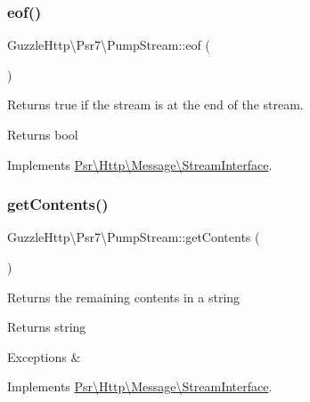 \subsubsection{\texorpdfstring{eof()}{eof()}}
{\footnotesize\ttfamily Guzzle\+Http\textbackslash{}\+Psr7\textbackslash{}\+Pump\+Stream\+::eof (\begin{DoxyParamCaption}{ }\end{DoxyParamCaption})}

Returns true if the stream is at the end of the stream.

\begin{DoxyReturn}{Returns}
bool 
\end{DoxyReturn}


Implements \hyperlink{interfacePsr_1_1Http_1_1Message_1_1StreamInterface_a502cc5ca370c6925b78d95d86d68777c}{Psr\textbackslash{}\+Http\textbackslash{}\+Message\textbackslash{}\+Stream\+Interface}.

\mbox{\label{classGuzzleHttp_1_1Psr7_1_1PumpStream_a15286eba4928175f71e085d042707717}} 
\subsubsection{\texorpdfstring{get\+Contents()}{getContents()}}
{\footnotesize\ttfamily Guzzle\+Http\textbackslash{}\+Psr7\textbackslash{}\+Pump\+Stream\+::get\+Contents (\begin{DoxyParamCaption}{ }\end{DoxyParamCaption})}

Returns the remaining contents in a string

\begin{DoxyReturn}{Returns}
string 
\end{DoxyReturn}

\begin{DoxyExceptions}{Exceptions}
{\em } & \\
\hline
\end{DoxyExceptions}


Implements \hyperlink{interfacePsr_1_1Http_1_1Message_1_1StreamInterface_a77f73d536f77e4a4e281d548ee905276}{Psr\textbackslash{}\+Http\textbackslash{}\+Message\textbackslash{}\+Stream\+Interface}.

